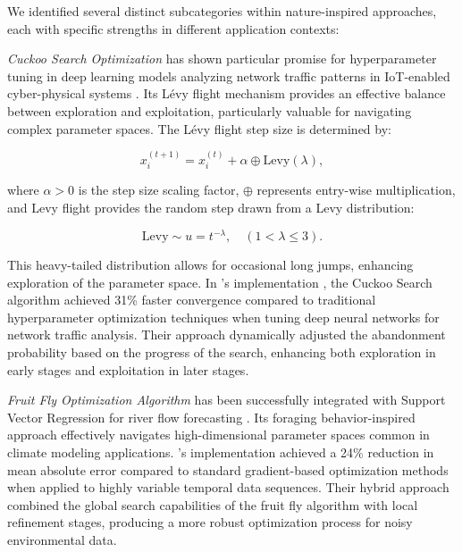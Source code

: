 \documentclass[acmsmall]{acmart}
\begin{document}
We identified several distinct subcategories within nature-inspired approaches, each with specific strengths in different application contexts:

\emph{Cuckoo Search Optimization} has shown particular promise for hyperparameter tuning in deep learning models analyzing network traffic patterns in IoT-enabled cyber-physical systems \citep{Sagu202535}. Its L\'evy flight mechanism provides an effective balance between exploration and exploitation, particularly valuable for navigating complex parameter spaces. The L\'evy flight step size is determined by:

\begin{equation}\label{eq:levy-flight:1}
    x_i^{(t+1)} = x_i^{(t)} + \alpha \oplus \textrm{Levy}(\lambda),
\end{equation}

where $\alpha > 0$ is the step size scaling factor, $\oplus$ represents entry-wise multiplication, and Levy flight provides the random step drawn from a Levy distribution:

\begin{equation}\label{eq:levy-flight:2}
    \textrm{Levy} \sim u = t^{-\lambda}, \quad (1 < \lambda \leq 3).
\end{equation}

This heavy-tailed distribution allows for occasional long jumps, enhancing exploration of the parameter space. In \citeauthor{Sagu202535}'s implementation \citep{Sagu202535}, the Cuckoo Search algorithm achieved 31\% faster convergence compared to traditional hyperparameter optimization techniques when tuning deep neural networks for network traffic analysis. Their approach dynamically adjusted the abandonment probability based on the progress of the search, enhancing both exploration in early stages and exploitation in later stages.

\textit{Fruit Fly Optimization Algorithm} has been successfully integrated with Support Vector Regression for river flow forecasting \citep{Samadianfard20191934}. Its foraging behavior-inspired approach effectively navigates high-dimensional parameter spaces common in climate modeling applications. \citeauthor{Samadianfard20191934}'s implementation achieved a 24\% reduction in mean absolute error compared to standard gradient-based optimization methods when applied to highly variable temporal data sequences. Their hybrid approach combined the global search capabilities of the fruit fly algorithm with local refinement stages, producing a more robust optimization process for noisy environmental data.
\end{document}
